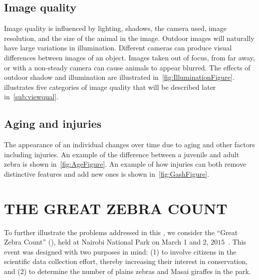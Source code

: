     \subsection{Image quality}
        Image quality is influenced by lighting, shadows, the camera used, image resolution, and the size of the
        animal in the image. Outdoor images will naturally have large variations in illumination. Different cameras
        can produce visual differences between images of an object. Images taken out of focus, from far away, or
        with a non-steady camera can cause animals to appear blurred. The effects of outdoor shadow and
        illumination are illustrated in~\cref{fig:IlluminationFigure}.  illustrates five
        categories of image quality that will be described later in~\cref{sub:viewqual}.

        \IlluminationFigure{}

        \QualityFigure{}

    \FloatBarrier{}
    \subsection{Aging and injuries}
        The appearance of an individual changes over time due to aging and other factors including injuries. An example
        of the difference between a juvenile and adult zebra is shown in~\cref{fig:AgeFigure}. An example of how
        injuries can both remove distinctive features and add new ones is shown in~\cref{fig:GashFigure}.

        \AgeFigure{}

        \GashFigure{}

\FloatBarrier{}
\section{THE GREAT ZEBRA COUNT}\label{sec:introgzc}

    To further illustrate the problems addressed in this \thesis{}, we consider the ``Great Zebra Count'' (\GZC{}),
    held at Nairobi National Park on March 1\st{} and 2\nd{}, $2015$~\cite{rubenstein_great_2015}. This event was
    designed with two purposes in mind: (1) to involve citizens in the scientific data collection effort, thereby
    increasing their interest in conservation, and (2) to determine the number of plains zebras and Masai giraffes
    in the park.

